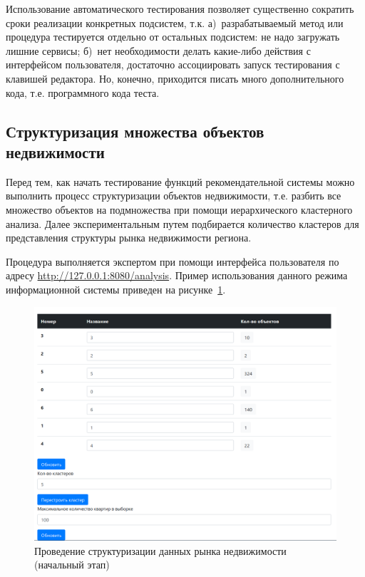 \documentclass[a4paper,14pt,openany,final]{extreport} %
\def\oldcaption{} \let\oldcaption=\caption
\def\caption{\stepcounter{captionsnum}\oldcaption}
\begin{document}
{Использование автоматического тестирования позволяет существенно сократить сроки реализации конкретных подсистем, т.к. а)~разрабатываемый метод или процедура тестируется отдельно от остальных подсистем: не надо загружать лишние сервисы; б)~нет необходимости делать какие-либо действия с интерфейсом пользователя, достаточно ассоциировать запуск тестирования с клавишей редактора. Но, конечно, приходится писать много дополнительного кода, т.е. программного кода теста.

\subsection{Структуризация множества объектов недвижимости}
Перед тем, как начать тестирование функций рекомендательной системы можно выполнить процесс структуризации объектов недвижимости, т.е. разбить все множество объектов на подмножества при помощи иерархического кластерного анализа. Далее экспериментальным путем подбирается количество кластеров для представления структуры рынка недвижимости региона.

Процедура выполняется экспертом при помощи интерфейса пользователя по адресу \url{http://127.0.0.1:8080/analysis}. Пример использования данного режима информационной системы приведен на рисунке~\ref{fig:exclus1}.
\begin{figure}[htbp]
  \centering
  \includegraphics[width=0.8\linewidth]{screen-cluster-start.png}
  \caption{Проведение структуризации данных рынка недвижимости (начальный этап)}
  \label{fig:exclus1}
\end{figure}

}
\end{document}
